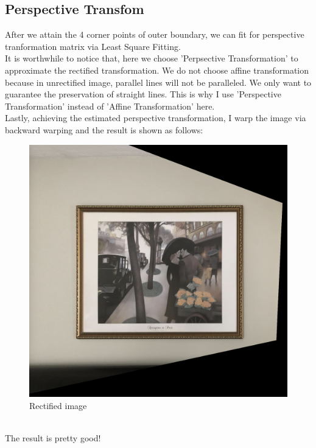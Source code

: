 \documentclass{article}
\begin{document}
\subsection{Perspective Transfom}
After we attain the 4 corner points of outer boundary, we can fit for perspective tranformation matrix via Least Square Fitting.
\vspace{4pt}
\\
It is worthwhile to notice that, here we choose 'Perpsective Transformation' to approximate the rectified transformation. We do not choose affine transformation because in unrectified image, parallel lines will not be paralleled. We only want to guarantee the preservation of straight lines. This is why I use 'Perspective Transformation' instead of 'Affine Transformation' here. 
\vspace{4pt}
\\
Lastly, achieving the estimated perspective transformation, I warp the image via backward warping and the result is shown as follows:
\begin{figure}[h]
	\centering
	\includegraphics[width=.25\textheight]{fig5.png}
	\caption{Rectified image}
	\label{fig:005}
\end{figure}
\\
The result is pretty good!
\end{document}
